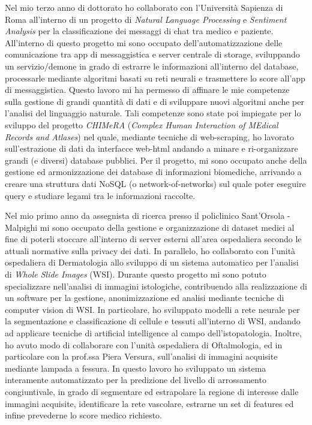 {Nel mio terzo anno di dottorato ho collaborato con l'Università Sapienza di Roma all'interno di un progetto di \emph{Natural Language Processing} e \emph{Sentiment Analysis} per la classificazione dei messaggi di chat tra medico e paziente.
All'interno di questo progetto mi sono occupato dell'automatizzazione delle comunicazione tra app di messaggistica e server centrale di storage, sviluppando un servizio/demone in grado di estrarre le informazioni all'interno del database, processarle mediante algoritmi basati su reti neurali e trasmettere lo score all'app di messaggistica.
Questo lavoro mi ha permesso di affinare le mie competenze sulla gestione di grandi quantità di dati e di sviluppare nuovi algoritmi anche per l'analisi del linguaggio naturale.
Tali competenze sono state poi impiegate per lo sviluppo del progetto \emph{CHIMeRA} (\emph{Complex Human Interaction of MEdical Records and Atlases}) nel quale, mediante tecniche di web-scraping, ho lavorato sull'estrazione di dati da interfacce web-html andando a minare e ri-organizzare grandi (e diversi) database pubblici.
Per il progetto, mi sono occupato anche della gestione ed armonizzazione dei database di informazioni biomediche, arrivando a creare una struttura dati NoSQL (o network-of-networks) sul quale poter eseguire query e studiare legami tra le informazioni raccolte.

Nel mio primo anno da assegnista di ricerca presso il policlinico Sant'Orsola - Malpighi mi sono occupato della gestione e organizzazione di dataset medici al fine di poterli stoccare all'interno di server esterni all'area ospedaliera secondo le attuali normative sulla privacy dei dati.
In parallelo, ho collaborato con l'unità ospedaliera di Dermatologia allo sviluppo di un sistema automatico per l'analisi di \emph{Whole Slide Images} (WSI).
Durante questo progetto mi sono potuto specializzare nell'analisi di immagini istologiche, contribuendo alla realizzazione di un software per la gestione, anonimizzazione ed analisi mediante tecniche di computer vision di WSI.
In particolare, ho sviluppato modelli a rete neurale per la segmentazione e classificazione di cellule e tessuti all'interno di WSI, andando ad applicare tecniche di artificial intelligence al campo dell'istopatologia.
Inoltre, ho avuto modo di collaborare con l'unità ospedaliera di Oftalmologia, ed in particolare con la prof.ssa Piera Versura, sull'analisi di immagini acquisite mediante lampada a fessura.
In questo lavoro ho sviluppato un sistema interamente automatizzato per la predizione del livello di arrossamento congiuntivale, in grado di segmentare ed estrapolare la regione di interesse dalle immagini acquisite, identificare la rete vascolare, estrarne un set di features ed infine prevederne lo score medico richiesto.

}
